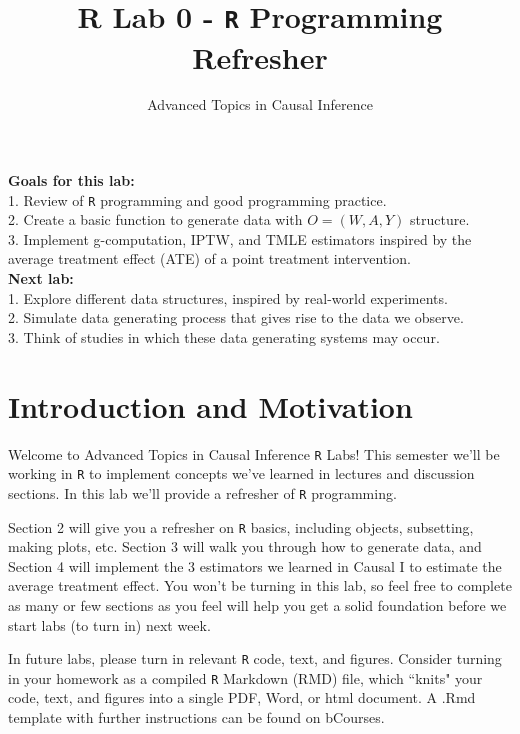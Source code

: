 \documentclass{exam}
\title{R Lab 0 - \texttt{R} Programming Refresher}
\author{Advanced Topics in Causal Inference}
\date{}
\begin{document}

\maketitle



\noindent \textbf{Goals for this lab:} \\ 
1. Review of \texttt{R} programming and good programming practice. \\
2. Create a basic function to generate data with $O = (W, A, Y)$ structure. \\
3. Implement g-computation, IPTW, and TMLE estimators inspired by the average treatment effect (ATE) of a point treatment intervention. \\

\noindent \textbf{Next lab:} \\
1. Explore different data structures, inspired by real-world experiments. \\
2. Simulate data generating process that gives rise to the data we observe. \\
3. Think of studies in which these data generating systems may occur.\\

\section{Introduction and Motivation}

Welcome to Advanced Topics in Causal Inference \texttt{R} Labs! This semester we'll be working in \texttt{R} to implement concepts we've learned in lectures and discussion sections. In this lab we'll provide a refresher of \texttt{R} programming.

\noindent Section 2 will give you a refresher on \texttt{R} basics, including objects, subsetting, making plots, etc. Section 3 will walk you through how to generate data, and Section 4 will implement the 3 estimators we learned in Causal I to estimate the average treatment effect. You won't be turning in this lab, so feel free to complete as many or few sections as you feel will help you get a solid foundation before we start labs (to turn in) next week.

\noindent In future labs, please turn in relevant \texttt{R} code, text, and figures. Consider turning in your homework as a compiled \texttt{R} Markdown (RMD) file, which ``knits" your code, text, and figures into a single PDF, Word, or html document. A .Rmd template with further instructions can be found on bCourses.
\end{document}
